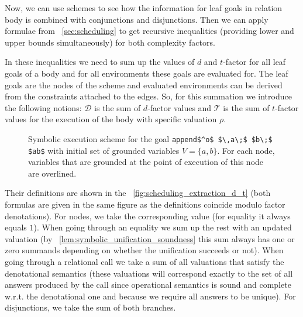 Now, we can use schemes to see how the information for leaf goals in relation body is combined with conjunctions and disjunctions. Then we can apply formulae
from \sectionword~\ref{sec:scheduling} to get recursive inequalities (providing lower and upper bounds simultaneously) for both complexity factors.

In these inequalities we need to sum up the values of $d$ and $t$-factor for all leaf goals of a body and for all environments these goals are evaluated for.
The leaf goals are
the nodes of the scheme and evaluated environments can be derived from the constraints attached to the edges. So, for this summation we introduce the following notions: $\mathcal{D}$
is the sum of $d$-factor values and $\mathcal{T}$ is the sum of $t$-factor values for the execution of the body with specific valuation $\rho$.

\begin{wrapfigure}{r}{0.5\textwidth}
\begin{center}
\end{center}
\caption{Symbolic execution scheme for the goal  \lstinline|append$^o$ $\,a\;$ $b\;$ $ab$|  with initial set of grounded variables $V = \{ a, b \}$. For each node, variables that
  are grounded at the point of execution of this node are overlined. }
\label{fig:example_scheme}
\end{wrapfigure}

 Their definitions are shown in
the \figureword~\ref{fig:scheduling_extraction_d_t} (both formulas are given in the same figure as the definitions coincide modulo factor denotations). For nodes, we take
the corresponding value (for equality it always equals $1$). When going through an equality we sum up the rest with an updated valuation (by \lemmaword~\ref{lem:symbolic_unification_soundness}
this sum always has one or zero summands depending on whether the unification succeeds or not). When going through a relational call we take a sum of all valuations that satisfy the
denotational semantics (these valuations will correspond exactly to the set of all answers produced by the call since operational semantics is sound and complete w.r.t. the denotational
one and because we require all answers to be unique). For disjunctions, we take the sum of both branches.

